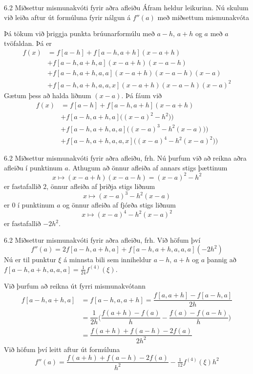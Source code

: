 \begin{frame}{6.2 Miðsettur mismunakvóti fyrir aðra afleiðu} 
Áfram heldur leikurinn.  
Nú skulum við leiða aftur út formúluna fyrir nálgun á $f''(a)$ með
miðsettum mismunakvóta 

\pause
\smallskip
Þá tökum við þriggja punkta brúunarformúlu með $a-h$, $a+h$ og
$a$ með $a$ tvöfaldan.  Þá er
\begin{align*}
  f(x)&=f[a-h]+f[a-h,a+h](x-a+h)\\
  &+f[a-h,a+h,a](x-a+h)(x-a-h)\\
  &+f[a-h,a+h,a,a](x-a+h)(x-a-h)(x-a)\\
  &+f[a-h,a+h,a,a,x](x-a+h)(x-a-h)(x-a)^2
\end{align*}
Gætum þess að halda liðnum $(x-a)$.  Þá fáum við
\begin{align*}
  f(x)&=f[a-h]+f[a-h,a+h](x-a+h)\\
  &+f[a-h,a+h,a]\big((x-a)^2-h^2)\big)\\
  &+f[a-h,a+h,a,a]\big((x-a)^3-h^2(x-a))\big)\\
  &+f[a-h,a+h,a,a,x]\big((x-a)^4-h^2(x-a)^2)\big)
\end{align*}
\end{frame}


\begin{frame}{6.2 Miðsettur mismunakvóti fyrir aðra afleiðu, frh.} 
Nú þurfum við að reikna aðra afleiðu í punktinum $a$. 
Athugum að önnur afleiða af annars stigs þættinum
$$
  x\mapsto (x-a+h)(x-a-h)=(x-a)^2-h^2
$$
er fastafallið $2$, önnur afleiða af þriðja stigs liðnum
$$
  x\mapsto (x-a)^3-h^2(x-a)
$$
er $0$ í punktinum $a$ og önnur afleiða af fjórða stigs liðnum
$$
  x\mapsto (x-a)^4-h^2(x-a)^2
$$
er fastafallið $-2h^2$.  
\end{frame}


\begin{frame}{6.2 Miðsettur mismunakvóti fyrir aðra afleiðu, frh.} 
Við höfum því 
$$
  f''(a)=2f[a-h,a+h,a]+f[a-h,a+h,a,a,a](-2h^2)
$$
Nú er til punktur $\xi$ á minnsta bili sem inniheldur 
$a-h$, $a+h$ og $a$ þannig að $f[a-h,a+h,a,a,a]=\tfrac
1{24}f^{(4)}(\xi)$.  

\pause
\smallskip
Við þurfum að reikna út fyrri mismunakvótann
\begin{align*}
  f[a-h,a+h,a]&=f[a-h,a,a+h]=\dfrac{f[a,a+h]-f[a-h,a]}{2h}\\
  &=\dfrac 1{2h}\bigg(\dfrac{f(a+h)-f(a)}h-\dfrac{f(a)-f(a-h)}h\bigg)\\
  &=\dfrac{f(a+h)+f(a-h)-2f(a)}{2h^2}  
\end{align*}
Við höfum því leitt aftur út formúluna
$$
  f''(a)=\dfrac{f(a+h)+f(a-h)-2f(a)}{h^2}-\tfrac
  1{12}f^{(4)}(\xi)h^2
$$
\end{frame}


